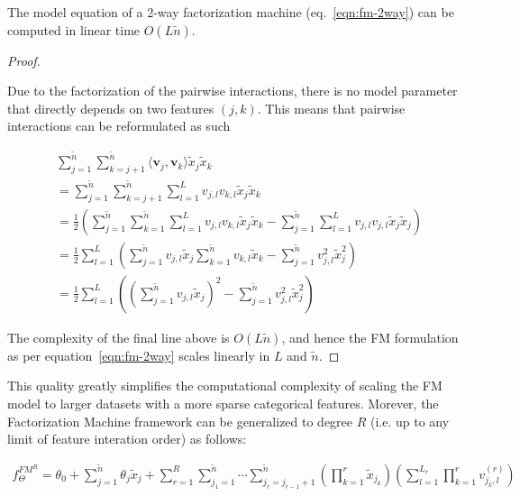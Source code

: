 \documentclass{mldsmsc}
\begin{document}
\begin{lemma}
\label{lemma:fm-linearity}
The model equation of a 2-way factorization machine (eq.~\ref{eqn:fm-2way}) can
be computed in linear time $O(L\tilde{n})$.
\end{lemma}

\begin{proof}
\label{prf:fm-linearity}

Due to the factorization of the pairwise interactions, there is no model
parameter that directly depends on two features $(j,k)$. This means that
pairwise interactions can be reformulated as such

\begin{align*}
    &\sum_{j=1}^{\tilde{n}} \sum_{k=j+1}^{\tilde{n}} \langle \mathbf{v}_j , \mathbf{v}_k \rangle \tilde{x}_j \tilde{x}_k \\
    &= \sum_{j=1}^{\tilde{n}} \sum_{k=j+1}^{\tilde{n}} 
    \sum_{l=1}^{L}v_{j,l} v_{k,l}\tilde{x}_j \tilde{x}_k \\
    &= \frac{1}{2} \left( \sum_{j=1}^{\tilde{n}} \sum_{k=1}^{\tilde{n}}
    \sum_{l=1}^{L} v_{j,l} v_{k,l} \tilde{x}_j \tilde{x}_k -
    \sum_{j=1}^{\tilde{n}} \sum_{l=1}^{L}v_{j,l} v_{j,l} \tilde{x}_j \tilde{x}_j \right)\\
    &=\frac{1}{2}\sum_{l=1}^{L} \left( \sum_{j=1}^{\tilde{n}}v_{j,l} \tilde{x}_j
    \sum_{k=1}^{\tilde{n}} v_{k,l} \tilde{x}_k - \sum_{j=1}^{\tilde{n}}
    v_{j,l}^2 \tilde{x}_j^2 \right)\\
    &= \frac{1}{2}\sum_{l=1}^{L} \left( \left(\sum_{j=1}^{\tilde{n}}v_{j,l} \tilde{x}_j\right)^2
    - \sum_{j=1}^{\tilde{n}} v_{j,l}^2 \tilde{x}_j^2 \right)
\end{align*}

The complexity of the final line above is $O(L\tilde{n})$, and hence the FM formulation
as per equation~\ref{eqn:fm-2way} scales linearly in $L$ and $\tilde{n}$.
\end{proof}

This quality greatly simplifies the computational complexity of scaling the FM model to larger
datasets with a more sparse categorical features. Morever, the Factorization Machine framework
can be generalized to degree $R$ (i.e. up to any limit of feature interation order) as follows:

\begin{multline}
\label{eqn:fm-rway}
f_{\Theta}^{FM^R} = \theta_0 + \sum_{j=1}^{\tilde{n}} \theta_{j} \tilde{x}_{j}
+ \sum_{r=1}^{R} \sum_{j_1=1}^{\tilde{n}} \cdots \sum_{j_r = j_{r-1} + 1}^{\tilde{n}}
\left( \prod_{k=1}^{r} \tilde{x}_{j_k} \right)
\left( \sum_{l = 1}^{L_r} \prod_{k=1}^{r} v_{j_k, l}^{(r)}\right)
\end{multline}
\end{document}
